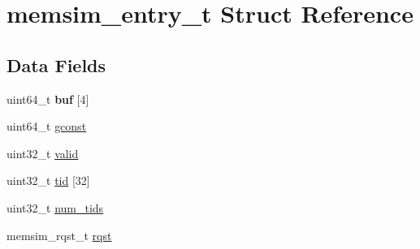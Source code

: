 \hypertarget{structmemsim__entry__t}{\section{memsim\-\_\-entry\-\_\-t Struct Reference}
\label{structmemsim__entry__t}
}
\subsection*{Data Fields}
\begin{DoxyCompactItemize}
\item 
\hypertarget{structmemsim__entry__t_ac8a6d8074d88a12a21d8b9b1b7a71dc9}{uint64\-\_\-t {\bfseries buf} \mbox{[}4\mbox{]}}\label{structmemsim__entry__t_ac8a6d8074d88a12a21d8b9b1b7a71dc9}

\item 
uint64\-\_\-t \hyperlink{structmemsim__entry__t_a5e6fc38a3aa83e0c1ec7fcf9e1cf2563}{gconst}
\item 
uint32\-\_\-t \hyperlink{structmemsim__entry__t_a0c0fd08ced6d9c59b1c2806186ac6dc2}{valid}
\item 
uint32\-\_\-t \hyperlink{structmemsim__entry__t_ae991f3a825c085a21997def9c86b26ee}{tid} \mbox{[}32\mbox{]}
\item 
uint32\-\_\-t \hyperlink{structmemsim__entry__t_a4930ffc1bfc88eb13462c97d5cdeb776}{num\-\_\-tids}
\item 
memsim\-\_\-rqst\-\_\-t \hyperlink{structmemsim__entry__t_a0bd6994a034a78c0d2b8d2adfc0cf2bd}{rqst}
\end{DoxyCompactItemize}


